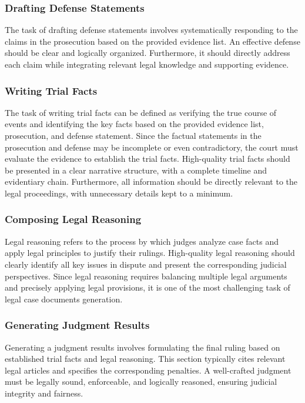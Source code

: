 \subsubsection{Drafting Defense Statements}
The task of drafting defense statements involves systematically responding to the claims in the prosecution based on the provided evidence list. An effective defense should be clear and logically organized.  Furthermore, it should directly address each claim while integrating relevant legal knowledge and supporting evidence.


\subsubsection{Writing Trial Facts}
The task of writing trial facts can be defined as verifying the true course of events and identifying the key facts based on the provided evidence list, prosecution, and defense statement. 
Since the factual statements in the prosecution and defense may be incomplete or even contradictory, the court must evaluate the evidence to establish the trial facts.
High-quality trial facts should be presented in a clear narrative structure, with a complete timeline and evidentiary chain. Furthermore, all information should be directly relevant to the legal proceedings, with unnecessary details kept to a minimum.

\subsubsection{Composing Legal Reasoning}
Legal reasoning refers to the process by which judges analyze case facts and apply legal principles to justify their rulings. High-quality legal reasoning should clearly identify all key issues in dispute and present the corresponding judicial perspectives. Since legal reasoning requires balancing multiple legal arguments and precisely applying legal provisions, it is one of the most challenging task of legal case documents generation.


\subsubsection{Generating Judgment Results}
Generating a judgment results involves formulating the final ruling based on established trial facts and legal reasoning. This section typically cites relevant legal articles and specifies the corresponding penalties. A well-crafted judgment must be legally sound, enforceable, and logically reasoned, ensuring judicial integrity and fairness.


